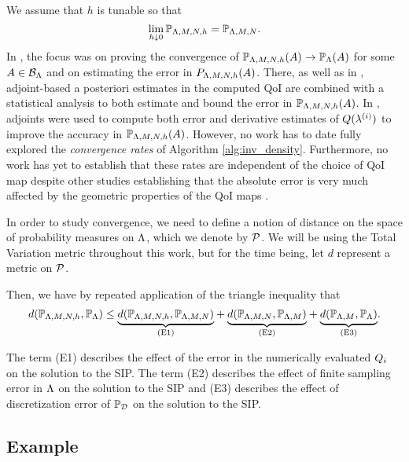 We assume that $h$ is tunable so that
\[
\lim\limits_{h \downarrow 0} \mathbb{P}_{{\Lambda}, M, N, h} = \mathbb{P}_{{\Lambda}, M, N}.
\]
In \cite{BM17}, the focus was on proving the convergence of $\mathbb{P}_{{\Lambda}, M, N, h} (A) \to \operatorname*{\mathbb{P}_{{\Lambda}}} (A)$ for some $A\in \mathcal{B}_{{\Lambda}}$ and on estimating the error in $P_{{\Lambda}, M, N, h}(A)$.
There, as well as in \cite{BGE+15}, adjoint-based a posteriori estimates in the computed QoI are combined with a statistical analysis to both estimate and bound the error in $\mathbb{P}_{{\Lambda}, M, N, h} (A)$.
In \cite{BM17}, adjoints were used to compute both error and derivative estimates of $Q(\lambda^{(i)})$ to improve the accuracy in $\mathbb{P}_{{\Lambda}, M, N, h} (A)$.
However, no work has to date fully explored the \emph{convergence rates} of Algorithm \ref{alg:inv_density}.
Furthermore, no work has yet to establish that these rates are independent of the choice of QoI map despite other studies establishing that the absolute error is very much affected by the geometric properties of the QoI maps \cite{BE13}.

In order to study convergence, we need to define a notion of distance on the space of probability measures on ${\Lambda}$, which we denote by $\mathcal{P}$. 
We will be using the Total Variation metric throughout this work, but for the time being, let $d$ represent a metric on $\mathcal{P}$.

Then, we have by repeated application of the triangle inequality that
\begin{equation}
\label{eq:set-triangleineq}
d(\mathbb{P}_{{\Lambda}, M, N, h}, \operatorname*{\mathbb{P}_{{\Lambda}}}) \leq 
\underset{ \text{(E1)} }{\underbrace{d(\mathbb{P}_{{\Lambda}, M, N, h},\mathbb{P}_{{\Lambda}, M, N})}} + 
\underset{ \text{(E2)} }{\underbrace{d(\mathbb{P}_{{\Lambda}, M, N}, \mathbb{P}_{{\Lambda}, M}) }}+ 
\underset{ \text{(E3)} }{\underbrace{d(\mathbb{P}_{{\Lambda}, M}, \operatorname*{\mathbb{P}_{{\Lambda}}}) }}.
\end{equation}

The term (E1) describes the effect of the error in the numerically evaluated $Q_i$ on the solution to the SIP. 
The term (E2) describes the effect of finite sampling error in ${\Lambda}$ on the solution to the SIP and (E3) describes the effect of discretization error of $\operatorname*{\mathbb{P}_{\mathcal{D}}}$ on the solution to the SIP. 

\subsection{Example}\label{sec:set-example}


